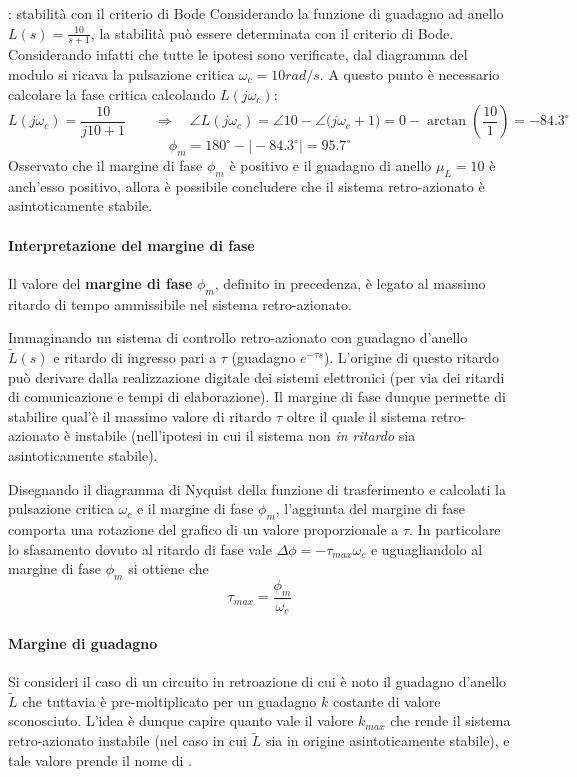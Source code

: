 		\begin{esempio}{: stabilità con il criterio di Bode}
			Considerando la funzione di guadagno ad anello $L(s) = \frac{10}{s+1}$, la stabilità può essere determinata con il criterio di Bode. Considerando infatti che tutte le  ipotesi sono verificate, dal diagramma del modulo si ricava la pulsazione critica $\omega_c = 10 rad/s$. A questo punto è necessario calcolare la fase critica calcolando $L(j\omega_c)$:
			\[L(j\omega_c) = \frac{10}{j10 + 1} \qquad \Rightarrow\quad \angle L(j\omega_c) = \angle 10 - \angle \big(j\omega_c + 1\big)=0 - \arctan\left( \frac{10}{1} \right) = -84.3^\circ  \]
			\[  \phi_m = 180^\circ - \big|-84.3^\circ \big| = 95.7^\circ \]
			Osservato che il margine di fase $\phi_m$ è positivo  e il guadagno di anello $\mu_L= 10$ è anch'esso positivo, allora è possibile concludere che il sistema retro-azionato è asintoticamente stabile.
		\end{esempio}
		
		\paragraph{Interpretazione del margine di fase}
		 Il valore del \textbf{margine di fase} $\phi_m$, definito in precedenza, è legato al massimo ritardo di tempo ammissibile nel sistema retro-azionato.
		
		Immaginando un sistema di controllo retro-azionato con guadagno d'anello $\tilde L(s)$ e ritardo di ingresso pari a $\tau$ (guadagno $e^{-\tau s}$). L'origine di questo ritardo può derivare dalla realizzazione digitale dei sistemi elettronici (per via dei ritardi di comunicazione e tempi di elaborazione). Il margine di fase dunque permette di stabilire qual'è il massimo valore di ritardo $\tau$ oltre il quale il sistema retro-azionato è instabile (nell'ipotesi in cui il sistema non \textit{in ritardo} sia asintoticamente stabile).
		
		Disegnando il diagramma di Nyquist della funzione di trasferimento e calcolati la pulsazione critica $\omega_c$ e il margine di fase $\phi_m$, l'aggiunta del  margine di fase comporta una rotazione del grafico di un valore proporzionale a $\tau$. In particolare lo sfasamento dovuto al ritardo di fase vale $\Delta \phi = -\tau_{max} \omega_c$ e uguagliandolo al margine di fase $\phi_m$ si ottiene che
		\[ \tau_{max} = \frac{\phi_m}{\omega_c} \]
		
		\paragraph{Margine di guadagno} Si consideri il caso di un circuito in retroazione di cui è noto il guadagno d'anello $\tilde L$ che tuttavia è pre-moltiplicato per un guadagno $k$ costante di valore sconosciuto. L'idea è dunque capire quanto vale il valore $k_{max}$ che rende il sistema retro-azionato instabile (nel caso in cui $\tilde L$ sia in origine asintoticamente stabile), e tale valore prende il nome di .
		
